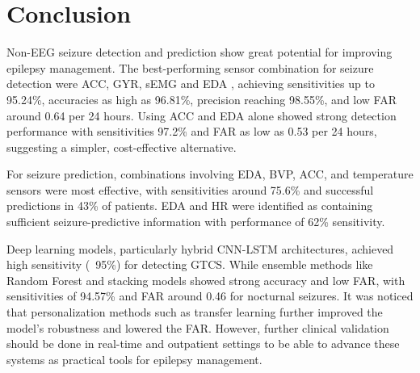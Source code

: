 \section{Conclusion}
Non-EEG seizure detection and prediction show great potential for improving epilepsy management. The best-performing sensor combination for seizure detection were ACC, GYR, sEMG and EDA , achieving sensitivities up to 95.24\%, accuracies as high as 96.81\%, precision reaching 98.55\%, and low FAR around 0.64 per 24 hours. Using ACC and EDA alone showed strong detection performance with sensitivities 97.2\% and FAR as low as 0.53 per 24 hours, suggesting a simpler, cost-effective alternative. 

For seizure prediction, combinations involving EDA, BVP, ACC, and temperature sensors were most effective, with sensitivities around 75.6\% and successful predictions in 43\% of patients. EDA and HR were identified as containing sufficient seizure-predictive information with performance of 62\% sensitivity. 

Deep learning models, particularly hybrid CNN-LSTM architectures, achieved high sensitivity (~95\%) for detecting GTCS. While ensemble methods like Random Forest and stacking models showed strong accuracy and low FAR, with sensitivities of 94.57\% and FAR around 0.46 for nocturnal seizures. It was noticed that personalization methods such as transfer learning further improved the model's robustness and lowered the FAR. However, further clinical validation should be done in real-time and outpatient settings to be able to advance these systems as practical tools for epilepsy management.

